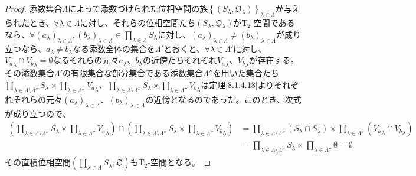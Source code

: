 \documentclass[dvipdfmx]{jsarticle}
\begin{document}
\begin{proof}
添数集合$\varLambda$によって添数づけられた位相空間の族$\left\{ \left( S_{\lambda},\mathfrak{O}_{\lambda} \right) \right\}_{\lambda \in \varLambda}$が与えられたとき、$\forall\lambda \in \varLambda$に対し、それらの位相空間たち$\left( S_{\lambda},\mathfrak{O}_{\lambda} \right)$が$\mathrm{T}_{2}$-空間であるなら、$\forall\left( a_{\lambda} \right)_{\lambda \in \varLambda},\left( b_{\lambda} \right)_{\lambda \in \varLambda} \in \prod_{\lambda \in \varLambda} S_{\lambda}$に対し、$\left( a_{\lambda} \right)_{\lambda \in \varLambda} \neq \left( b_{\lambda} \right)_{\lambda \in \varLambda}$が成り立つなら、$a_{\lambda} \neq b_{\lambda}$なる添数全体の集合を$\varLambda'$とおくと、$\forall\lambda \in \varLambda'$に対し、${V_{a}}_{\lambda} \cap {V_{b}}_{\lambda} = \emptyset$なるそれらの元々$a_{\lambda}$、$b_{\lambda}$の近傍たちそれぞれ${V_{a}}_{\lambda}$、${V_{b}}_{\lambda}$が存在する。その添数集合$\varLambda'$の有限集合な部分集合である添数集合$\varLambda''$を用いた集合たち$\prod_{\lambda \in \varLambda \setminus \varLambda''} S_{\lambda} \times \prod_{\lambda \in \varLambda''} {V_{a}}_{\lambda}$、$\prod_{\lambda \in \varLambda \setminus \varLambda''} S_{\lambda} \times \prod_{\lambda \in \varLambda''} {V_{b}}_{\lambda}$は定理\ref{8.1.4.18}よりそれぞれそれらの元々$\left( a_{\lambda} \right)_{\lambda \in \varLambda}$、$\left( b_{\lambda} \right)_{\lambda \in \varLambda}$の近傍となるのであった。このとき、次式が成り立つので、
\begin{align*}
\left( \prod_{\lambda \in \varLambda \setminus \varLambda''} S_{\lambda} \times \prod_{\lambda \in \varLambda''} {V_{a}}_{\lambda} \right) \cap \left( \prod_{\lambda \in \varLambda \setminus \varLambda''} S_{\lambda} \times \prod_{\lambda \in \varLambda''} {V_{b}}_{\lambda} \right) &= \prod_{\lambda \in \varLambda \setminus \varLambda''} \left( S_{\lambda} \cap S_{\lambda} \right) \times \prod_{\lambda \in \varLambda''} \left( {V_{a}}_{\lambda} \cap {V_{b}}_{\lambda} \right)\\
&= \prod_{\lambda \in \varLambda \setminus \varLambda''} S_{\lambda} \times \prod_{\lambda \in \varLambda''} \emptyset = \emptyset
\end{align*}
その直積位相空間$\left( \prod_{\lambda \in \varLambda} S_{\lambda},\mathfrak{O} \right)$も$\mathrm{T}_{2}$-空間となる。\par

\end{proof}
\end{document}
